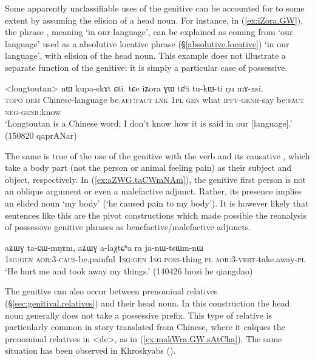 Some apparently unclassifiable uses of the genitive can be accounted for to some extent by assuming the elision of a head noun.  For instance, in (\ref{ex:iZora.GW}), the phrase , meaning `in our language', can be explained as coming from  `our language' used as a absolutive locative phrase (§\ref{absolutive.locative}) `in our language', with elision of the head noun. This example does not illustrate a separate function of the genitive: it is simply a particular case of possessive.

\begin{exe}
\ex \label{ex:iZora.GW}
\gll  <longtoutan> nɯ kupa-skɤt ɕti. tɕe iʑora ɣɯ tɕʰi tu-kɯ-ti ŋu mɤ-xsi. \\
\textsc{topo} \textsc{dem} Chinese-language be.\textsc{aff}:\textsc{fact} \textsc{lnk} \textsc{1pl} \textsc{gen} what \textsc{ipfv}-\textsc{genr}-say be:\textsc{fact} \textsc{neg}-\textsc{genr}:know \\
\glt `Longtoutan is a Chinese word; I don't know how it is said in our [language].'  (150820 qaprANar)
\end{exe}

The same is true of the use of the genitive with the verb  and its causative , which take a body part (not the person or animal feeling pain) as their subject and object, respectively. In (\ref{ex:aZWG.taCWmNAm}), the genitive first person  is not an oblique argument or even a malefactive adjunct. Rather, its presence implies an elided noun  `my body' (`he caused pain to my body'). It is however likely that sentences like this are the pivot constructions which made possible the reanalysis of possessive genitive phrases as benefactive/malefactive adjuncts.

\begin{exe}
\ex \label{ex:aZWG.taCWmNAm}
\gll aʑɯɣ ta-ɕɯ-mŋɤm, aʑɯɣ a-laχtɕʰa ra ja-nɯ-tsɯm-nɯ \\
\textsc{1sg}:\textsc{gen} \textsc{aor}:3\flobv{}-\textsc{caus}-be.painful \textsc{1sg}:\textsc{gen} \textsc{1sg}.\textsc{poss}-thing \textsc{pl} \textsc{aor}:3\flobv{}-\textsc{vert}-take.away-\textsc{pl} \\
\glt `He hurt me and took away my things.' (140426 luozi he qiangdao) 	
\end{exe}

The genitive can also occur between prenominal relatives (§\ref{sec:genitival.relatives}) and their head noun. In this construction the head noun generally does not take a possessive prefix. This type of relative is particularly common in story translated from Chinese, where it calques the prenominal relatives in  <de>, as in (\ref{ex:makWra.GW.sAtCha}). The same situation has been observed in Khroskyabs (\citealt[640--643]{lai17khroskyabs}).

